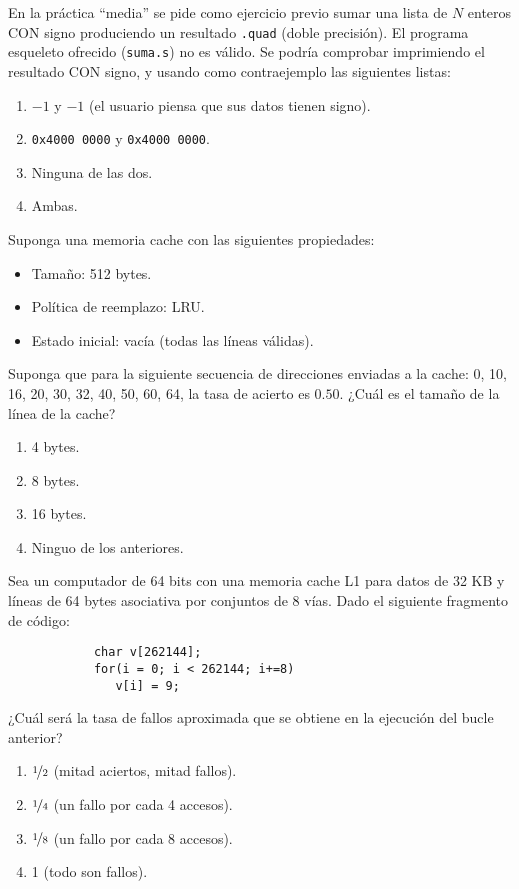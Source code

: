 \documentclass[12pt]{article}
\begin{document}
    \begin{ejercicio}
        En la práctica ``media'' se pide como ejercicio previo sumar una lista de $N$ enteros CON signo produciendo un resultado \verb|.quad| (doble precisión). El programa esqueleto ofrecido (\verb|suma.s|) no es válido. Se podría comprobar imprimiendo el resultado CON signo, y usando como contraejemplo las siguientes listas:
        \begin{enumerate}[label=\alph*)]
            \item $-1$ y $-1$ (el usuario piensa que sus datos tienen signo).
            \item \verb|0x4000 0000| y \verb|0x4000 0000|.
            \item Ninguna de las dos.
            \item Ambas.
        \end{enumerate}
    \end{ejercicio}
    \begin{ejercicio}
        Suponga una memoria cache con las siguientes propiedades:
        \begin{itemize}
            \item Tamaño: 512 bytes.
            \item Política de reemplazo: LRU\@.
            \item Estado inicial: vacía (todas las líneas válidas).
        \end{itemize}
        Suponga que para la siguiente secuencia de direcciones enviadas a la cache: 0, 10, 16, 20, 30, 32, 40, 50, 60, 64, la tasa de acierto es $0.50$. ¿Cuál es el tamaño de la línea de la cache?
        \begin{enumerate}[label=\alph*)]
            \item 4 bytes.
            \item 8 bytes.
            \item 16 bytes.
            \item Ninguo de los anteriores.
        \end{enumerate}
    \end{ejercicio}
    \begin{ejercicio}
        Sea un computador de 64 bits con una memoria cache L1 para datos de 32 KB y líneas de 64 bytes asociativa por conjuntos de 8 vías. Dado el siguiente fragmento de código:
        \begin{verbatim}
            char v[262144];
            for(i = 0; i < 262144; i+=8)
               v[i] = 9;
        \end{verbatim}
        ¿Cuál será la tasa de fallos aproximada que se obtiene en la ejecución del bucle anterior?
        \begin{enumerate}[label=\alph*)]
            \item $\nicefrac{1}{2}$ (mitad aciertos, mitad fallos).
            \item $\nicefrac{1}{4}$ (un fallo por cada 4 accesos).
            \item $\nicefrac{1}{8}$ (un fallo por cada 8 accesos).
            \item 1 (todo son fallos).
        \end{enumerate}
    \end{ejercicio}
\end{document}
